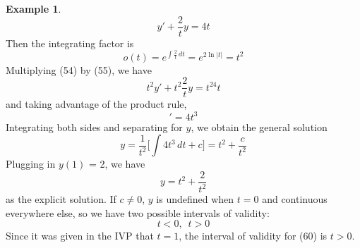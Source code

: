 \documentclass[11pt]{article}
\theoremstyle{definition}
\newtheorem{ex}{Example}
\begin{document}
\begin{ex}
\begin{equation}
        y' + \frac{2}{t}y = 4t
    \end{equation}Then the integrating factor is \begin{equation}
        o(t) = e^{\int\frac{2}{t}\,dt} = e^{2\ln{|t|}} = t^2
    \end{equation}Multiplying (54) by (55), we have \begin{equation}
        t^2y' + t^2\frac{2}{t}y = t^24t
    \end{equation} and taking advantage of the product rule, \begin{equation}
        [t^2y]' = 4t^3
    \end{equation}Integrating both sides and separating for $y$, we obtain the general solution \begin{equation}
        y = \frac{1}{t^2}\Bigg[\int 4t^3\,dt + c\Bigg] = t^2 + \frac{c}{t^2}
    \end{equation} Plugging in $y(1)$ = 2, we have \begin{equation}
        y = t^2 + \frac{2}{t^2}
    \end{equation} as the explicit solution. If $c \neq 0$, $y$ is undefined when $t = 0$ and continuous everywhere else, so we have two possible intervals of validity: \begin{equation}
        t < 0,\,\,\, t > 0
    \end{equation}Since it was given in the IVP that $t = 1$, the interval of validity for (60) is $t > 0$.
\end{ex}
\end{document}
